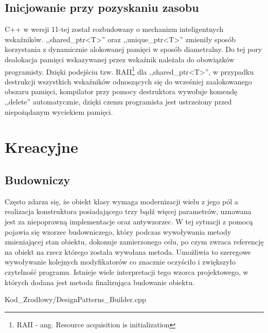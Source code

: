     \subsection{Inicjowanie przy pozyskaniu zasobu}
        C++ w wersji 11-tej został rozbudowany o mechanizm inteligentnych wskaźników. ,,shared\_ptr<T>'' oraz ,,unique\_ptr<T>'' zmieniły sposób korzystania z
        dynamicznie alokowanej pamięci w sposób diametralny. Do tej pory dealokacja pamięci wskazywanej przez wskaźnik należała do obowiązków programisty.
        Dzięki podejściu tzw. RAII\footnote{\label{RAII} RAII - ang. Resource acquisition is initialization} dla ,,shared\_ptr<T>'', 
        w przypadku destrukcji wszystkich wskaźników odnoszących się do wcześniej zaalokowanego obszaru pamięci,
        kompilator przy pomocy destruktora wywołuje komendę ,,delete'' automatycznie, dzięki czemu programista jest ustrzeżony przed niepożądanym wyciekiem pamięci.

\section{Kreacyjne}
    \subsection{Budowniczy}
        Często zdarza się, że obiekt klasy wymaga modernizacji wielu z jego pól a realizacja konstruktora posiadającego trzy bądź więcej parametrów,
        uznawana jest za niepoprawną implementacje oraz antywzorzec. W tej sytuacji z pomocą pojawia się wzorzec budowniczego, który podczas wywoływania metody 
        zmieniającej stan obiektu, dokonuje zamierzonego celu, po czym zwraca referencję na obiekt na rzecz którego została wywołana metoda. 
        Umożliwia to szeregowe wywoływanie kolejnych modyfikatorów co znacznie oczyściło i zwiększyło czytelność programu. Istnieje wiele interpretacji tego wzorca projektowego,
        w których dodana jest metoda finalizująca budowanie obiektu.
        
            {Kod_Zrodlowy/DesignPatterns_Builder.cpp}
